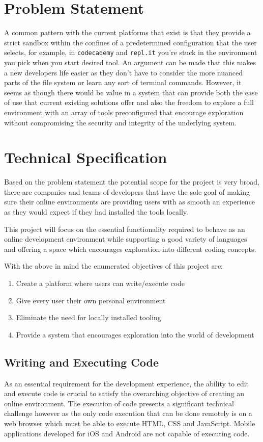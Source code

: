 \section{Problem Statement} \label{section:probart-probstate}
A common pattern with the current platforms that exist is that they provide a strict sandbox within the confines of a predetermined configuration that the user selects, for example, in \texttt{codecademy} and \texttt{repl.it} you're stuck in the environment you pick when you start desired tool. An argument can be made that this makes a new developers life easier as they don't have to consider the more nuanced parts of the file system or learn any sort of terminal commands. However, it seems as though there would be value in a system that can provide both the ease of use that current existing solutions offer and also the freedom to explore a full environment with an array of tools preconfigured that encourage exploration without compromising the security and integrity of the underlying system.

\section{Technical Specification} \label{section:probart-techspec}
Based on the problem statement the potential scope for the project is very broad, there are companies and teams of developers that have the sole goal of making sure their online environments are providing users with as smooth an experience as they would expect if they had installed the tools locally.

This project will focus on the essential functionality required to behave as an online development environment while supporting a good variety of languages and offering a space which encourages exploration into different coding concepts.

With the above in mind the enumerated objectives of this project are: 
\begin{enumerate}
    \item Create a platform where users can write/execute code
    \item Give every user their own personal environment
    \item Eliminate the need for locally installed tooling
    \item Provide a system that encourages exploration into the world of development
\end{enumerate}

\subsection{Writing and Executing Code}
As an essential requirement for the development experience, the ability to edit and execute code is crucial to satisfy the overarching objective of creating an online environment. The execution of code presents a significant technical challenge however as the only code execution that can be done remotely is on a web browser which must be able to execute HTML, CSS and JavaScript. Mobile applications developed for iOS and Android are not capable of executing code.

